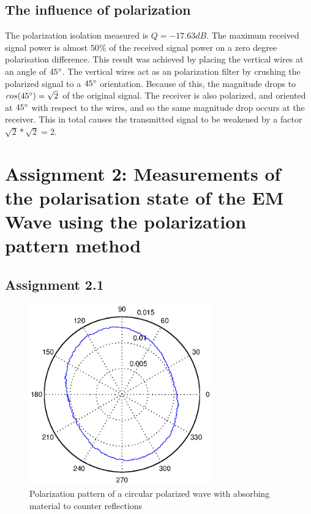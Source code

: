 \documentclass{article}
\begin{document}
	\subsection{The influence of polarization}
		The polarization isolation measured is $Q = -17.63dB$.
		\newline
		The maximum received signal power is almost $50\%$ of the received signal power on a zero degree polarisation difference. 
		This result was achieved by placing the vertical wires at an angle of $45\degree$.
		The vertical wires act as an polarization filter by crushing the polarized signal to a $45\degree$ orientation. 
		Because of this, the magnitude drops to $cos(45\degree) = \sqrt{2}$ of the original signal.
		The receiver is also polarized, and oriented at $45\degree$ with respect to the wires, and so the same magnitude drop occurs at the receiver.
		This in total causes the transmitted signal to be weakened by a factor $\sqrt{2}*\sqrt{2} = 2$.






\section{Assignment 2: Measurements of the polarisation state of the EM Wave using
the polarization pattern method}


\subsection{Assignment 2.1}\label{ass21}
\begin{figure}[H]
\centering
\includegraphics[width=0.7\textwidth]{Plotjes/ass21.eps}
\caption{Polarization pattern of a circular polarized wave with absorbing material to counter reflections }
\end{figure}
\end{document}
